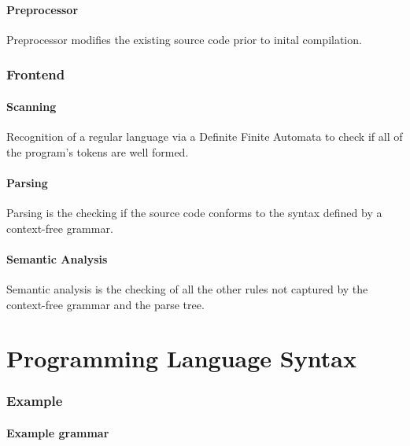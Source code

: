 \documentclass[11pt]{book}
\begin{document}
\subsubsection{Preprocessor}
Preprocessor modifies the existing source code prior to inital compilation.
\subsection{Frontend}
\subsubsection{Scanning}

Recognition of a regular language via a Definite Finite Automata to check if all of the program's tokens are well formed.

\subsubsection{Parsing}
Parsing is the checking if the source code conforms to the syntax defined by a context-free grammar.

\subsubsection{Semantic Analysis}
Semantic analysis is the checking of all the other rules not captured by the context-free grammar and the parse tree.

\chapter{Programming Language Syntax}


\subsection{Example}

\subsubsection{Example grammar}
\end{document}
